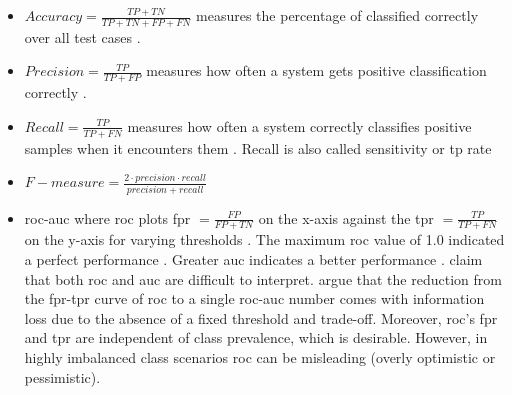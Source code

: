 \begin{itemize}
    \item $Accuracy = \frac{TP + TN}{TP + TN + FP + FN}$ \citep{elmanarelbouanani_authorship_2014,neal_surveying_2018} 
    measures the percentage of classified correctly over all test cases \citep{neal_surveying_2018}.

    \item $Precision = \frac{TP}{TP + FP}$ \citep{elmanarelbouanani_authorship_2014,neal_surveying_2018,chen_web_2008} 
    measures how often a system gets positive classification correctly \citep{neal_surveying_2018}.

    \item $Recall = \frac{TP}{TP + FN}$ \citep{elmanarelbouanani_authorship_2014,neal_surveying_2018,chen_web_2008} 
    measures how often a system correctly classifies positive samples when it encounters them \citep{neal_surveying_2018}.
    Recall is also called sensitivity or \acl{tp} rate \citep{palivela_optimization_2021}

    \item $F-measure = \frac{2 \cdot precision \cdot recall}{precision + recall}$~\citep{chen_web_2008,abbasi_writeprints_2008}

    \item \ac{roc-auc} \citep{bevendorff_overview_2024,weerasinghe_feature_vector_difference_2021,kocher_unine_2015}
    where \ac{roc} plots \ac{fpr} $= \frac{FP}{FP+TN}$ on the x-axis against the \ac{tpr} $=\frac{TP}{TP+FN}$ on the y-axis 
    for varying thresholds \citep{kocher_unine_2015,neal_surveying_2018}.
    The maximum \ac{roc} value of 1.0 indicated a perfect performance \citep{kocher_unine_2015}.
    Greater \ac{auc} indicates a better performance \citep{neal_surveying_2018}.
    \citet{kocher_unine_2015} claim that both \ac{roc} and \ac{auc} are difficult to interpret.
    \citet{llm_detection_av_2025} argue that the reduction from the \ac{fpr}-\ac{tpr} curve of \ac{roc} to a single \ac{roc-auc} number 
    comes with information loss due to the absence of a fixed threshold and trade-off.
    Moreover, \ac{roc}'s \ac{fpr} and \ac{tpr} are independent of class prevalence, which is desirable.
    However, in highly imbalanced class scenarios \ac{roc} can be misleading (overly optimistic or pessimistic).
    

\end{itemize}
